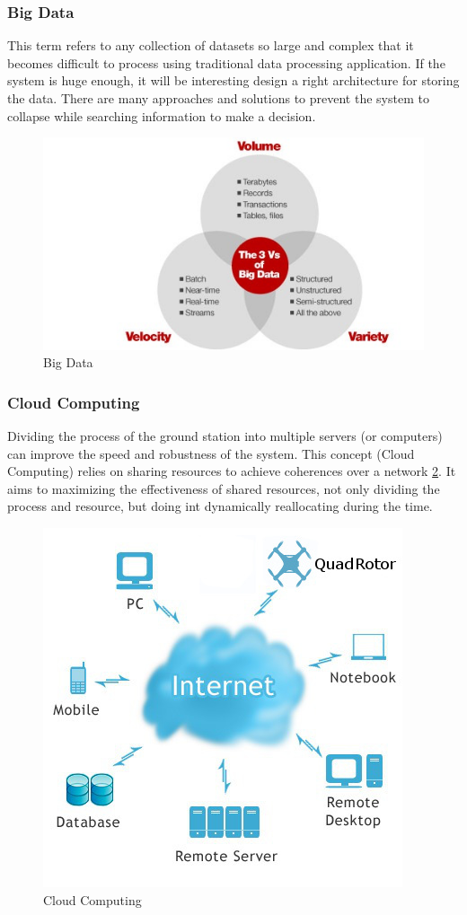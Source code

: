 	\subsubsection{Big Data}
	This term refers to any collection of datasets so large and complex that it becomes difficult to process using traditional data processing application. If the system is huge enough, it will be interesting design a right architecture for storing the data. There are many approaches\cite{Big_data_Ecosystem} \cite{Big_data_mapReduce} and solutions to prevent the system to collapse while searching information to make a decision.
	
	\begin{figure}[th]
		\centering
		\includegraphics[width=0.7\linewidth]{../Images/c6/big_data}
		\caption{Big Data}
		\label{fig:big_data}
	\end{figure}
		
	\subsubsection{Cloud Computing}

	Dividing the process of the ground station into multiple servers (or computers) can improve the speed and robustness of the system. This concept (Cloud Computing) relies on sharing resources to achieve coherences over a network \ref{fig:cloud_computing}. It aims to maximizing the effectiveness of shared resources, not only dividing the process and resource, but doing int dynamically reallocating during the time. \cite{Cloud_computing}
	
	\begin{figure}[th]
		\centering
		\includegraphics[width=0.7\linewidth]{../Images/c6/cloudcomputing}
		\caption{Cloud Computing}
		\label{fig:cloud_computing}
	\end{figure}

	
	
